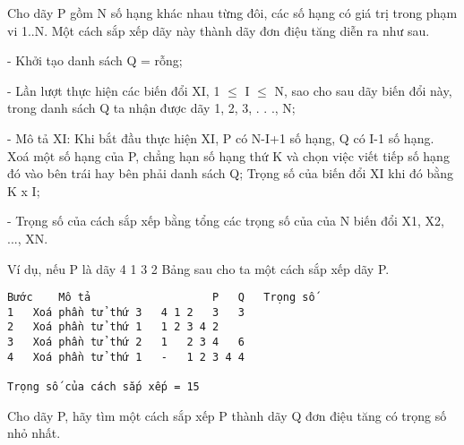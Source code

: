 Cho dãy P gồm N số hạng khác nhau từng đôi, các số hạng có giá trị trong phạm vi 1..N. Một cách sắp xếp dãy này thành dãy đơn điệu tăng diễn ra như sau.  

   -         Khởi tạo danh sách Q = rỗng;  

   -         Lần lượt thực hiện các biến đổi XI, 1  $\le$  I  $\le$ N, sao cho sau dãy biến đổi này, trong danh sách Q ta nhận được dãy 1, 2, 3, . . ., N;  

   -         Mô tả XI: Khi bắt đầu thực hiện XI, P có N-I+1 số hạng, Q có I-1 số hạng. Xoá một số hạng của P, chẳng hạn số hạng thứ K và chọn việc viết tiếp số hạng đó vào bên trái hay bên phải danh sách Q; Trọng số của biến đổi XI khi đó bằng K x I;  

   -         Trọng số của cách sắp xếp bằng tổng các trọng số của của N biến đổi X1, X2, ..., XN.  

   Ví dụ, nếu P là dãy 4 1 3 2 Bảng sau cho ta một cách sắp xếp dãy P.  
\begin{verbatim}
Bước	Mô tả	                P	Q	Trọng số
1	Xoá phần tử thứ 3	4 1 2	3	3
2	Xoá phần tử thứ 1	1 2	3 4	2
3	Xoá phần tử thứ 2	1	2 3 4	6
4	Xoá phần tử thứ 1	-	1 2 3 4	4

Trọng số của cách sắp xếp = 15

\end{verbatim}

   Cho dãy P, hãy tìm một cách sắp xếp P thành dãy Q đơn điệu tăng có trọng số nhỏ nhất.